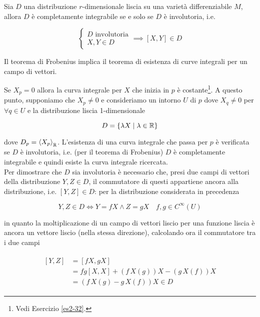 \begin{theorem}[Frobenius]
	Sia $ D $ una distribuzione $ r $-dimensionale liscia su una varietà differenziabile $ M $, allora $ D $ è completamente integrabile se e solo se $ D $ è involutoria, i.e.
	
	\begin{equation}
		\begin{cases}
			D \text{ involutoria}\\
			X,Y \in D
		\end{cases}
		\implies%
		[X,Y] \in D
	\end{equation}
\end{theorem}

\begin{remark}
	Il teorema di Frobenius implica il teorema di esistenza di curve integrali per un campo di vettori.
\end{remark}

Se $ X_{p} = 0 $ allora la curva integrale per $ X $ che inizia in $ p $ è costante\footnote{%
	Vedi Esercizio \ref{es2-32}.%
}. A questo punto, supponiamo che $ X_{p} \neq 0 $ e consideriamo un intorno $ U $ di $ p $ dove $ X_{q} \neq 0 $ per $ \forall q \in U $ e la distribuzione liscia 1-dimensionale

\begin{equation}
	D = \{ \lambda X \mid \lambda \in \mathbb{R} \}
\end{equation}

dove $ D_{p} = \ev{ X_{p} }_{\R} $. L'esistenza di una curva integrale che passa per $ p $ è verificata se $ D $ è involutoria, i.e. (per il teorema di Frobenius) $ D $ è completamente integrabile e quindi esiste la curva integrale ricercata.\\
Per dimostrare che $ D $ sia involutoria è necessario che, presi due campi di vettori della distribuzione $ Y,Z \in D $, il commutatore di questi appartiene ancora alla distribuzione, i.e. $ [Y,Z] \in D $: per la distribuzione considerata in precedenza

\begin{equation}
	Y,Z \in D \iff Y = fX \wedge Z = gX \quad f,g \in C^{\infty}(U)
\end{equation}

in quanto la moltiplicazione di un campo di vettori liscio per una funzione liscia è ancora un vettore liscio (nella stessa direzione), calcolando ora il commutatore tra i due campi

\begin{align}
	\begin{split}
		[Y,Z] &= [fX,gX]\\
		&= fg [X,X] + (f \, X(g)) X - (g \, X(f)) X\\
		&= (f \, X(g) - g \, X(f)) X \in D
	\end{split}
\end{align}

